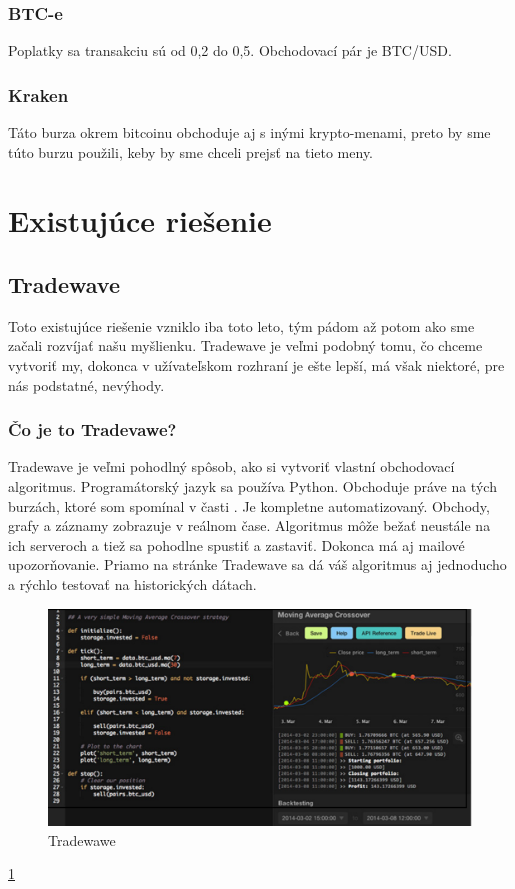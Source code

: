 \subsubsection{BTC-e} 
Poplatky sa transakciu sú od 0,2 do 0,5. Obchodovací pár je BTC/USD. \cite{BTC} 
\subsubsection{Kraken} 
Táto burza okrem bitcoinu obchoduje aj s inými krypto-menami, preto by sme túto burzu použili, keby by sme chceli prejsť na tieto meny. \cite{Kre} 
\section{Existujúce riešenie} 
\subsection{Tradewave} 
Toto existujúce riešenie vzniklo iba toto leto, tým pádom až potom ako sme začali rozvíjať našu myšlienku. Tradewave je veľmi podobný tomu, čo chceme vytvoriť my, dokonca v užívateľskom rozhraní je ešte lepší, má však niektoré, pre nás podstatné, nevýhody.  
\subsubsection{Čo je to Tradevawe?} 
Tradewave je veľmi pohodlný spôsob, ako si vytvoriť vlastní obchodovací algoritmus. Programátorský jazyk sa používa Python. Obchoduje práve na tých burzách, ktoré som spomínal v časti . Je kompletne automatizovaný. Obchody, grafy a záznamy zobrazuje v reálnom čase. Algoritmus môže bežať neustále na ich serveroch a tiež sa pohodlne spustiť a zastaviť. Dokonca má aj mailové upozorňovanie. Priamo na stránke Tradewave sa dá váš algoritmus aj jednoducho a rýchlo testovať na historických dátach.  \cite{Tw} 
\begin{figure}[!hbt]
\begin{center}
\includegraphics[width=1\textwidth]{trade}
\caption{Tradewawe}
\label{img:trade}
\end{center}
\end{figure}
\ref{img:trade}
